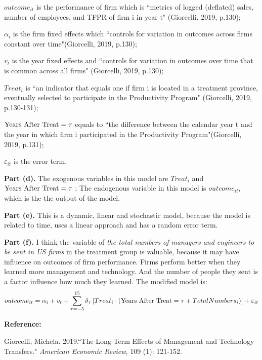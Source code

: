 \documentclass[letterpaper,12pt]{article}
\theoremstyle{definition}
\begin{document}
$outcome_{it}$ is the performance of firm which is ``metrics of logged (deflated) sales, number of employees, and TFPR of firm i in year t" (Giorcelli, 2019, p.130); 

$\alpha_{i} $ is the firm fixed effects which ``controls for variation in outcomes across firms constant over time"(Giorcelli, 2019, p.130); 

$ v_{t}$ is the year fixed effects and ``controls for variation in outcomes over time that is common across all firms" (Giorcelli, 2019, p.130); 

$Treat_{i}$ is ``an indicator that equals one if firm i is located in a treatment province, eventually selected to participate in the Productivity Program" (Giorcelli, 2019, p.130-131); 

$\textup{Years After Treat} = \tau$ equals to ``the difference between the calendar year t and the year in which firm i participated in the Productivity Program"(Giorcelli, 2019, p.131); 

$\varepsilon_{it}$ is the error term.

\textbf{Part (d).} The exogenous variables in this model are $Treat_{i}$  and $ \textup{Years After Treat} = \tau $  ; The endogenous variable in this model is $outcome_{it}$, which is the the output of the model.

\textbf{Part (e).} This is a dynamic, linear and stochastic model, because the model is related to time, uses a linear approach and has a random error term.

\textbf{Part (f).} I think the variable of \emph{the total numbers of managers and engineers to be sent in US firms} in the treatment group is valuable, because it may have influence on outcomes of firm performance. Firms perform better when they learned more management and technology. And the number of people they sent is a factor influence how much they learned. The modified model is:
\begin{equation*}
 outcome_{it} = \alpha_{i} + v_{t} + \sum_{\tau =-5}^{15} \delta_{\tau }\left [ Treat_{i} \cdot \left ( \textup{Years After Treat} = \tau  + TotalNumbers_{i} \right ) \right ] + \varepsilon_{it}
\end{equation*}
 
\textbf{Reference:}

Giorcelli, Michela. 2019.``The Long-Term Effects of Management and Technology Transfers."  \emph{American Economic Review}, 109 (1): 121-152.

\vspace{5mm}
\end{document}
